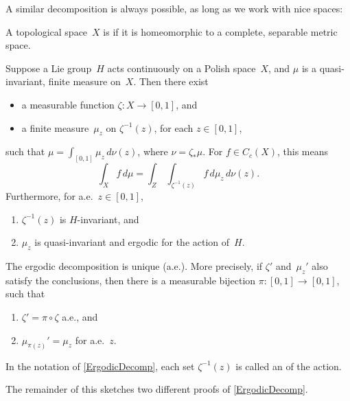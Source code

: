 A similar decomposition is always possible, as long as we work with nice spaces:

\begin{defn}
A topological space~$X$ is  if it is homeomorphic to a complete, separable metric space.
\end{defn}

\begin{thm} \label{ErgodicDecomp}
Suppose a Lie group~$H$ acts continuously on a Polish space~$X$, and $\mu$ is a quasi-invariant, finite measure on~$X$. Then there exist
	\begin{itemize}
	\item a measurable function $\zeta \colon X \to [0,1]$, 
	and
	\item a finite measure~$\mu_z$ on $\zeta^{-1}(z)$, for each $z \in [0,1]$, 
	\end{itemize}
such that $\mu = \int_{[0,1]} \mu_z \, d \nu(z)$, where $\nu = \zeta_* \mu$. For $f \in C_c(X)$, this means
	$$ \int_X f \, d\mu = \int_Z \, \int_{\zeta^{-1}(z)} f \, d\mu_z \, d\nu(z) .$$
Furthermore, for a.e.\ $z \in [0,1]$, 
	\begin{enumerate}
	\item $\zeta^{-1}(z)$ is $H$-invariant,
	and
	\item $\mu_z$ is quasi-invariant and ergodic for the action of~$H$.
	\end{enumerate}
\end{thm}

\begin{rem}
The ergodic decomposition is unique (a.e.). More precisely, if $\zeta'$ and~$\mu_z'$ also satisfy the conclusions, then there is a measurable bijection $\pi \colon [0,1] \to [0,1]$, such that 
	\begin{enumerate}
	\item $\zeta' = \pi \circ \zeta$ a.e.,
	and
	\item $\mu_{\pi(z)}' = \mu_z$ for a.e.~$z$.
	\end{enumerate}
\end{rem}

\begin{defn}
In the notation of \cref{ErgodicDecomp}, each set $\zeta^{-1}(z)$ is called an  of the action.
\end{defn}


The remainder of this  sketches two different proofs of \cref{ErgodicDecomp}.


